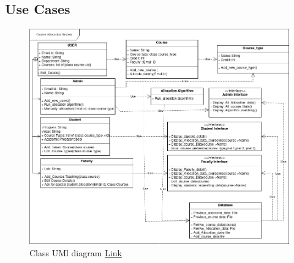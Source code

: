 \documentclass[conference]{IEEEtran}
\begin{document}
\subsection{Use Cases}
\begin{figure}[htbp]
    \centering
    \includegraphics[width=\linewidth]{UML.png}
    \caption{Class UMl diagram \href{https://github.com/LokeshVenkatachalam/CODEFORCES/blob/main/x2.io.drawio.png}{Link}}
    \label{fig}
\end{figure}
\end{document}
